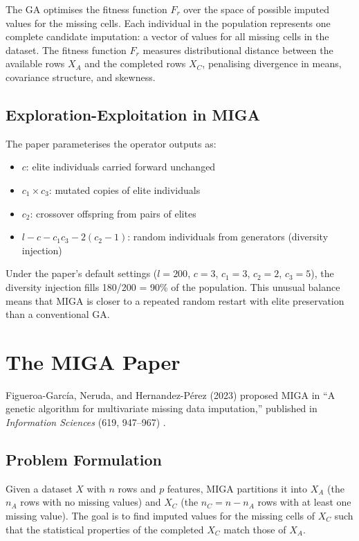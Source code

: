 The GA optimises the fitness function $F_r$ over the space of possible imputed values for the missing cells. Each individual in the population represents one complete candidate imputation: a vector of values for all missing cells in the dataset. The fitness function $F_r$ measures distributional distance between the available rows $X_A$ and the completed rows $X_C$, penalising divergence in means, covariance structure, and skewness.

\subsection{Exploration-Exploitation in MIGA}

The paper parameterises the operator outputs as:
\begin{itemize}
    \item $c$: elite individuals carried forward unchanged
    \item $c_1 \times c_3$: mutated copies of elite individuals
    \item $c_2$: crossover offspring from pairs of elites
    \item $l - c - c_1 c_3 - 2(c_2 - 1)$: random individuals from generators (diversity injection)
\end{itemize}

Under the paper's default settings ($l=200$, $c=3$, $c_1=3$, $c_2=2$, $c_3=5$), the diversity injection fills 180/200 = 90\% of the population. This unusual balance means that MIGA is closer to a repeated random restart with elite preservation than a conventional GA.


\section{The MIGA Paper}

Figueroa-Garc\'ia, Neruda, and Hernandez-P\'erez (2023) proposed MIGA in ``A genetic algorithm for multivariate missing data imputation,'' published in \textit{Information Sciences} (619, 947--967) \cite{FigueroaGarcia2023}.

\subsection{Problem Formulation}

Given a dataset $X$ with $n$ rows and $p$ features, MIGA partitions it into $X_A$ (the $n_A$ rows with no missing values) and $X_C$ (the $n_C = n - n_A$ rows with at least one missing value). The goal is to find imputed values for the missing cells of $X_C$ such that the statistical properties of the completed $X_C$ match those of $X_A$.

